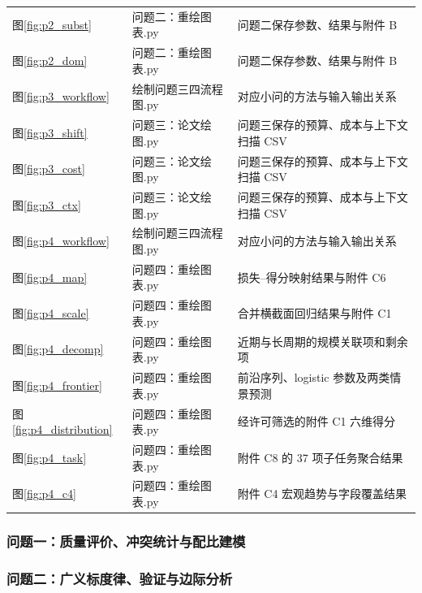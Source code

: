 \begin{longtable}{@{}p{}p{}p{}@{}}
图\ref{fig:p2_subst} & 问题二：重绘图表.py & 问题二保存参数、结果与附件 B \\
图\ref{fig:p2_dom} & 问题二：重绘图表.py & 问题二保存参数、结果与附件 B \\
图\ref{fig:p3_workflow} & 绘制问题三四流程图.py & 对应小问的方法与输入输出关系 \\
图\ref{fig:p3_shift} & 问题三：论文绘图.py & 问题三保存的预算、成本与上下文扫描 CSV \\
图\ref{fig:p3_cost} & 问题三：论文绘图.py & 问题三保存的预算、成本与上下文扫描 CSV \\
图\ref{fig:p3_ctx} & 问题三：论文绘图.py & 问题三保存的预算、成本与上下文扫描 CSV \\
图\ref{fig:p4_workflow} & 绘制问题三四流程图.py & 对应小问的方法与输入输出关系 \\
图\ref{fig:p4_map} & 问题四：重绘图表.py & 损失--得分映射结果与附件 C6 \\
图\ref{fig:p4_scale} & 问题四：重绘图表.py & 合并横截面回归结果与附件 C1 \\
图\ref{fig:p4_decomp} & 问题四：重绘图表.py & 近期与长周期的规模关联项和剩余项 \\
图\ref{fig:p4_frontier} & 问题四：重绘图表.py & 前沿序列、logistic 参数及两类情景预测 \\
图\ref{fig:p4_distribution} & 问题四：重绘图表.py & 经许可筛选的附件 C1 六维得分 \\
图\ref{fig:p4_task} & 问题四：重绘图表.py & 附件 C8 的 37 项子任务聚合结果 \\
图\ref{fig:p4_c4} & 问题四：重绘图表.py & 附件 C4 宏观趋势与字段覆盖结果 \\
\end{longtable}

\subsubsection*{问题一：质量评价、冲突统计与配比建模}


\subsubsection*{问题二：广义标度律、验证与边际分析}



